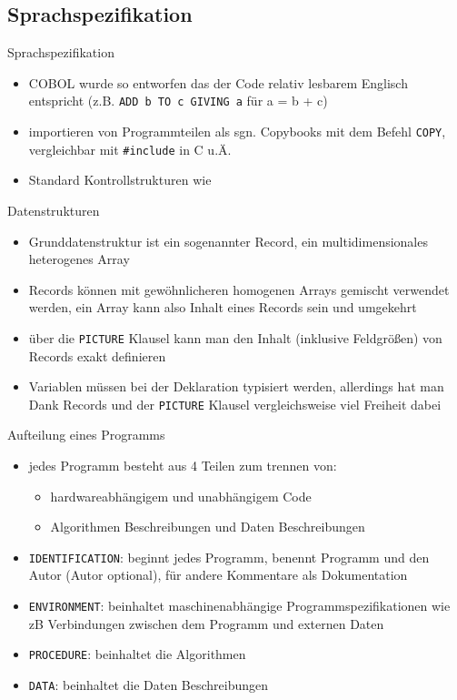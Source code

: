 \documentclass[handout]{beamer}
\begin{document}
\subsection{Sprachspezifikation}

\begin{frame}{Sprachspezifikation}
	\begin{itemize}
		\item
			COBOL wurde so entworfen das der Code relativ lesbarem Englisch entspricht (z.B. \texttt{ADD b TO c GIVING a} f\"ur a = b + c)
		\item
			importieren von Programmteilen als sgn. Copybooks mit dem Befehl \texttt{COPY}, vergleichbar mit \texttt{\#include} in C u.\"A.
		\item
			Standard Kontrollstrukturen wie 
	\end{itemize}
\end{frame}

\begin{frame}{Datenstrukturen}
	\begin{itemize}
		\item
			Grunddatenstruktur ist ein sogenannter Record, ein multidimensionales heterogenes Array
		\item
			Records k\"onnen mit gew\"ohnlicheren homogenen Arrays gemischt verwendet werden, ein Array kann also Inhalt eines Records sein und umgekehrt
		\item
			über die \texttt{PICTURE} Klausel kann man den Inhalt (inklusive Feldgrößen) von Records exakt definieren
		\item
			Variablen müssen bei der Deklaration typisiert werden, allerdings hat man Dank Records und der \texttt{PICTURE} Klausel vergleichsweise viel Freiheit dabei
	\end{itemize}
\end{frame}

\begin{frame}{Aufteilung eines Programms}
	\begin{itemize}
		\item
			jedes Programm besteht aus 4 Teilen zum trennen von:
			\begin{itemize}
			 \item hardwareabh\"angigem und unabh\"angigem Code
			 \item Algorithmen Beschreibungen und Daten Beschreibungen
			 \end{itemize}
		\item
			\texttt{IDENTIFICATION}: beginnt jedes Programm, benennt Programm und den Autor (Autor optional), für andere Kommentare als Dokumentation
		\item
			\texttt{ENVIRONMENT}: beinhaltet maschinenabhängige Programmspezifikationen wie zB Verbindungen zwischen dem Programm und externen Daten
		\item
			\texttt{PROCEDURE}: beinhaltet die Algorithmen
		\item
			\texttt{DATA}: beinhaltet die Daten Beschreibungen
	\end{itemize}
\end{frame}
\end{document}
